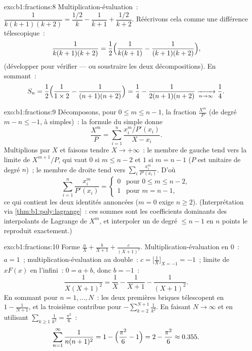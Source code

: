 \begin{solution}{exo:b1:fractions:8}
Multiplication-évaluation~: $\dfrac{1}{k(k+1)(k+2)} = \dfrac{1/2}{k} -
\dfrac{1}{k+1} + \dfrac{1/2}{k+2}$. Réécrivons cela comme une différence
télescopique~:
\[
\frac{1}{k(k+1)(k+2)}
= \frac12\Bigl(\frac{1}{k(k+1)} - \frac{1}{(k+1)(k+2)}\Bigr),
\]
(développer pour vérifier --- ou soustraire les deux décompositions). En
sommant~:
\[
S_n = \frac12\Bigl(\frac{1}{1 \times 2} - \frac{1}{(n+1)(n+2)}\Bigr)
= \frac14 - \frac{1}{2(n+1)(n+2)}
\xrightarrow[n \to \infty]{} \frac14 .
\]
\end{solution}

\begin{solution}{exo:b1:fractions:9}
Décomposons, pour $0 \leq m \leq n - 1$, la fraction $\frac{X^m}{P}$
(de degré $m - n \leq -1$, à  simples)~: la formule du  simple
donne
\[
\frac{X^m}{P} = \sum_{i=1}^{n} \frac{x_i^m / P'(x_i)}{X - x_i} .
\]
Multiplions par $X$ et faisons tendre $X \to +\infty$~: le membre de
gauche tend vers la limite de $X^{m+1}/P$, qui vaut $0$ si $m \leq n -
2$ et $1$ si $m = n - 1$ ($P$ est unitaire de degré $n$)~; le membre de
droite tend vers $\sum_i \frac{x_i^m}{P'(x_i)}$. D'où
\[
\sum_{i=1}^{n} \frac{x_i^{m}}{P'(x_i)} =
\begin{cases}
0 & \text{pour } 0 \leq m \leq n-2,\\
1 & \text{pour } m = n - 1,
\end{cases}
\]
ce qui contient les deux identités annoncées ($m = 0$ exige $n \geq
2$). (Interprétation via \cref{thm:b1:poly:lagrange}~: ces sommes sont
les coefficients dominants des interpolants de Lagrange de $X^m$, et
interpoler un  de degré $\leq n-1$ en $n$ points le reproduit
exactement.)
\end{solution}

\begin{solution}{exo:b1:fractions:10}
Forme $\frac aX + \frac b{X+1} + \frac c{(X+1)^2}$.
Multiplication-évaluation en $0$~: $a = 1$~; multiplication-évaluation au
 double~: $c = \bigl[\frac1X \bigr]_{X=-1} = -1$~; limite de $xF(x)$
en l'infini~: $0 = a + b$, donc $b = -1$~:
\[
\frac{1}{X(X+1)^2} = \frac1X - \frac1{X+1} - \frac1{(X+1)^2} .
\]
En sommant pour $n = 1, \dots, N$~: les deux premières briques
télescopent en $1 - \frac1{N+1}$, et la troisième contribue pour
$-\sum_{k=2}^{N+1} \frac1{k^2}$. En faisant $N \to \infty$ et en
utilisant $\sum_{k\geq1} \frac1{k^2} = \frac{\pi^2}6$~:
\[
\sum_{n=1}^{\infty}\frac{1}{n(n+1)^2}
= 1 - \Bigl(\frac{\pi^2}6 - 1\Bigr) = 2 - \frac{\pi^2}6
\approx 0.355 .
\]
\end{solution}

